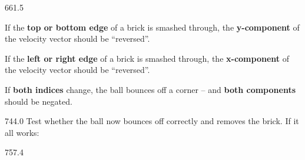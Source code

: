 \documentclass{aslab}
\begin{document}
\begin{region}[x=74.7,right=0,pitch=13.6]{661.5}
\begin{ntasks}
\item If the \textbf{top or bottom edge} of a brick is smashed through, the
  \textbf{y-component} of the velocity vector should be ``reversed''.
\item If the \textbf{left or right edge} of a brick is smashed through, the
  \textbf{x-component} of the velocity vector should be ``reversed''.
\item If \textbf{both indices} change, the ball bounces off a corner -- and
  \textbf{both components} should be negated.
\end{ntasks}
\end{region}

\begin{region}[x=74.7,right=0]{744.0}
Test whether the ball now bounces off correctly and removes the brick. If it
all works:
\end{region}

\begin{region}[x=74.7,right=0,pitch=13.2]{757.4}
\\
\end{region}
\end{document}

